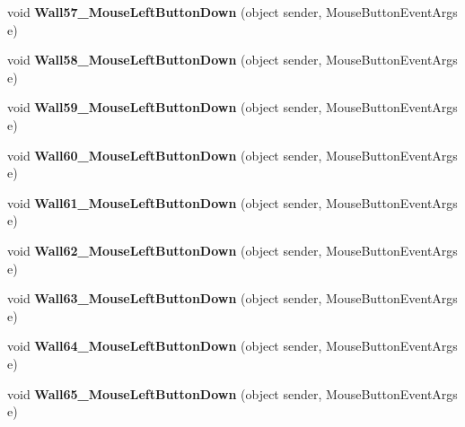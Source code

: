 \begin{DoxyCompactItemize}
void {\bfseries Wall57\+\_\+\+Mouse\+Left\+Button\+Down} (object sender, Mouse\+Button\+Event\+Args e)
\item 
\mbox{\label{class_r6_1_1_border_window_aed016c9144f98dd89bf960a3e911513c}} 
void {\bfseries Wall58\+\_\+\+Mouse\+Left\+Button\+Down} (object sender, Mouse\+Button\+Event\+Args e)
\item 
\mbox{\label{class_r6_1_1_border_window_a6af64c7934294fe2efb6427c826c994f}} 
void {\bfseries Wall59\+\_\+\+Mouse\+Left\+Button\+Down} (object sender, Mouse\+Button\+Event\+Args e)
\item 
\mbox{\label{class_r6_1_1_border_window_adb2aa61d6d7d4de5969037255551a55d}} 
void {\bfseries Wall60\+\_\+\+Mouse\+Left\+Button\+Down} (object sender, Mouse\+Button\+Event\+Args e)
\item 
\mbox{\label{class_r6_1_1_border_window_aa22d1ccac1233006dac9f7321a9345da}} 
void {\bfseries Wall61\+\_\+\+Mouse\+Left\+Button\+Down} (object sender, Mouse\+Button\+Event\+Args e)
\item 
\mbox{\label{class_r6_1_1_border_window_aa29ce86c5f723944300b4419e6ddff87}} 
void {\bfseries Wall62\+\_\+\+Mouse\+Left\+Button\+Down} (object sender, Mouse\+Button\+Event\+Args e)
\item 
\mbox{\label{class_r6_1_1_border_window_aae9b30ab8f08d520d455cc404bdac651}} 
void {\bfseries Wall63\+\_\+\+Mouse\+Left\+Button\+Down} (object sender, Mouse\+Button\+Event\+Args e)
\item 
\mbox{\label{class_r6_1_1_border_window_a78f2b28f67c5bc3ad508576b145d9323}} 
void {\bfseries Wall64\+\_\+\+Mouse\+Left\+Button\+Down} (object sender, Mouse\+Button\+Event\+Args e)
\item 
\mbox{\label{class_r6_1_1_border_window_aed38c9533c7ba7f3363c079b9644a69e}} 
void {\bfseries Wall65\+\_\+\+Mouse\+Left\+Button\+Down} (object sender, Mouse\+Button\+Event\+Args e)
\item 
\mbox{\label{class_r6_1_1_border_window_a85122ca0728c6c9326ddbbb3b994408f}} 

\end{DoxyCompactItemize}
